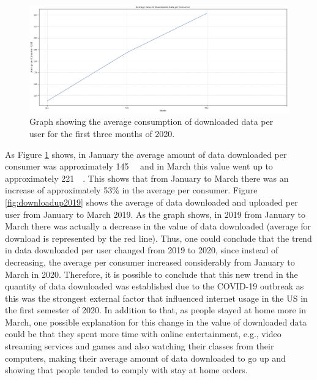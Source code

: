 \documentclass[conference,10pt]{IEEEtran}
\begin{document}
\begin{figure}
\centering
\includegraphics[width=1.0\linewidth]{figs/download2020.PNG}
\caption{Graph showing the average consumption of downloaded data per user for the first three months of 2020.}
\label{fig:download2020}
\end{figure}

As Figure \ref{fig:download2020} shows, in January the average amount of data downloaded per consumer was approximately \SI{145}{\giga\byte} and in March this value went up to approximately \SI{221}{\giga\byte}. This shows that from January to March there was an increase of approximately 53\% in the average per consumer. Figure \ref{fig:downloadup2019} shows the average of data downloaded and uploaded per user from January to March 2019. As the graph shows, in 2019 from January to March there was actually a decrease in the value of data downloaded (average for download is represented by the red line). Thus, one could conclude that the trend in data downloaded per user changed from 2019 to 2020, since instead of decreasing, the average per consumer increased considerably from January to March in 2020. Therefore, it is possible to conclude that this new trend in the quantity of data downloaded was established due to the COVID-19 outbreak as this was the strongest external factor that influenced internet usage in the US in the first semester of 2020. In addition to that, as people stayed at home more in March, one possible explanation for this change in the value of downloaded data could be that they spent more time with online entertainment, e.g., video streaming services and games and also watching their classes from their computers, making their average amount of data downloaded to go up and showing that people tended to comply with stay at home orders.
\end{document}
